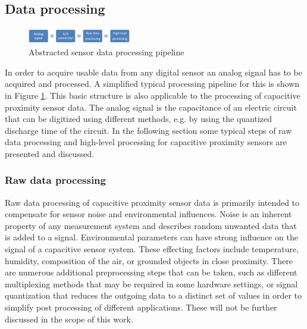 \subsection{Data processing}
\begin{figure}[h]
\centering
\includegraphics[width=0.4\textwidth]{images/proc_pipe}
\caption{Abstracted sensor data processing pipeline}
\label{fig:rel_proc_pipe}
\end{figure} 
In order to acquire usable data from any digital sensor an analog signal has to be acquired and processed. A simplified typical processing pipeline for this is shown in Figure \ref{fig:rel_proc_pipe}. This basic structure is also applicable to the processing of capacitive proximity sensor data. The analog signal is the capacitance of an electric circuit that can be digitized using different methods, e.g. by using the quantized discharge time of the circuit. In the following section some typical steps of raw data processing and high-level processing for capacitive proximity sensors are presented and discussed. 
\subsubsection{Raw data processing}
Raw data processing of capacitive proximity sensor data is primarily intended to compensate for sensor noise and environmental influences. Noise is an inherent property of any measurement system and describes random unwanted data that is added to a signal. Environmental parameters can have strong influence on the signal of a capacitive sensor system. These effecting factors include temperature, humidity, composition of the air, or grounded objects in close proximity. There are numerous additional preprocessing steps that can be taken, such as different multiplexing methods that may be required in some hardware settings, or signal quantization that reduces the outgoing data to a distinct set of values in order to simplify post processing of different applications. These will not be further discussed in the scope of this work.
